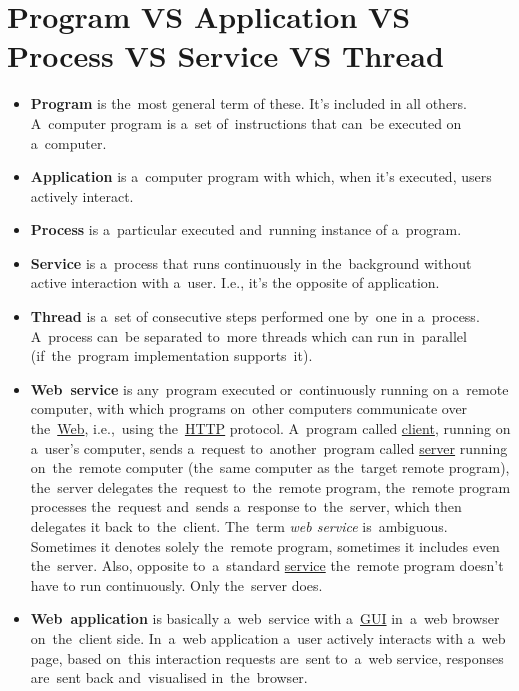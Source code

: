 \section*{\fontsize{17}{17} \selectfont Program VS Application VS Process VS Service VS Thread}
\label{applicationprocessprogramservicethread}
\begin{itemize}
    \item \textbf{Program} is the~most general term of these.
          It's included in all others.
          A~computer program is a~set of~instructions that can~be executed on a~computer.
    \item \textbf{Application} is a~computer program with which, when it's executed, users actively interact.
    \item \textbf{Process} is a~particular executed and~running instance of a~program.
    \item \textbf{Service} is a~process that runs continuously in the~background without active interaction with a~user.
          I.e., it's the opposite of application.
    \item \textbf{Thread} is a~set of consecutive steps performed one by~one in a~process.
          A~process can~be separated to~more threads which can run in~parallel (if~the~program implementation supports~it).
\end{itemize}

\label{webserviceapplication}
\begin{itemize}
    \item \textbf{Web~service} is any~program executed or~continuously running on a~remote computer, with which programs on~other computers communicate over the~\hyperref[internetweb]{Web}, i.e.,~using the~\hyperref[http]{HTTP} protocol.
          A~program called \hyperref[clientserverarchitecture]{client}, running on a~user's computer, sends a~request to~another~program called \hyperref[clientserverarchitecture]{server} running on~the~remote computer (the~same computer as the~target remote program), the~server delegates the~request to~the~remote program, the~remote program processes the~request and~sends a~response to~the~server, which then delegates it back to~the~client. \warningnonl The~term \textit{web service} is~ambiguous.
          Sometimes it denotes solely the~remote program, sometimes it includes even the~server.
          Also, opposite to~a~standard \hyperref[applicationprocessprogramservicethread]{service} the~remote program doesn't have to run continuously.
          Only the~server does.
    \item \textbf{Web~application} is basically a~web~service with a~\hyperref[shellcligui]{GUI} in~a~web browser on~the~client side.
          In~a~web application a~user actively interacts with a~web page, based on~this interaction requests are~sent to~a~web service, responses are~sent back and~visualised in~the~browser.
\end{itemize}
\newpage

